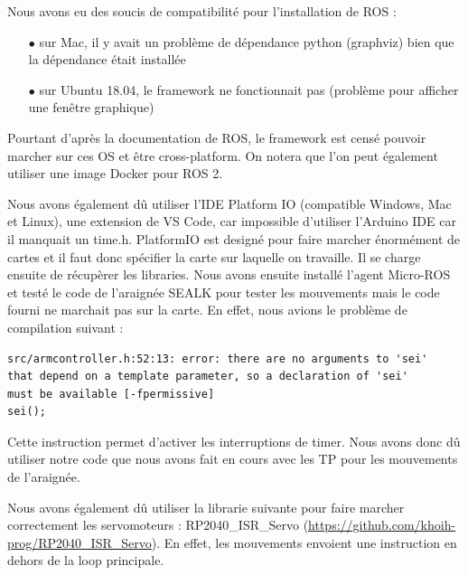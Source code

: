 Nous avons eu des soucis de compatibilité pour l'installation de ROS :  
\begin{itemize}
	\item[$\bullet$] sur Mac, il y avait un problème de dépendance python (graphviz) bien que la dépendance était installée
	\item[$\bullet$]sur Ubuntu 18.04, le framework ne fonctionnait pas (problème pour afficher une fenêtre graphique)
\end{itemize}

Pourtant d'après la documentation de ROS, le framework est censé pouvoir marcher sur ces OS et être cross-platform.
On notera que l'on peut également utiliser une image Docker pour ROS 2. 
\linebreak

Nous avons également dû utiliser l’IDE Platform IO (compatible Windows, Mac et Linux), une extension de VS Code, 
car impossible d'utiliser l'Arduino IDE car il manquait un time.h.
PlatformIO est designé pour faire marcher énormément de cartes et il faut donc spécifier la carte sur laquelle on travaille. 
Il se charge ensuite de récupèrer les libraries.
Nous avons ensuite installé l’agent Micro-ROS et testé le code de l’araignée SEALK pour tester les mouvements mais le code 
fourni ne marchait pas sur la carte. En effet, nous avions le problème de compilation suivant :  

\begin{lstlisting}
src/armcontroller.h:52:13: error: there are no arguments to 'sei' 
that depend on a template parameter, so a declaration of 'sei' 
must be available [-fpermissive]
sei();
\end{lstlisting}
Cette instruction permet d'activer les interruptions de timer.
Nous avons donc dû utiliser notre code que nous avons fait en cours avec les TP pour les mouvements de l'araignée.
\linebreak

Nous avons également dû utiliser la librarie suivante pour faire marcher correctement les servomoteurs : RP2040\_ISR\_Servo (\url{https://github.com/khoih-prog/RP2040_ISR_Servo}).
En effet, les mouvements envoient une instruction en dehors de la loop principale.
